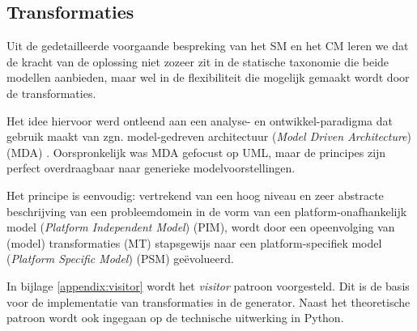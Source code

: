 
\subsection{Transformaties}
\label{subsection:devel-transformations}

Uit de gedetailleerde voorgaande bespreking van het SM en het CM leren we dat
de kracht van de oplossing niet zozeer zit in de statische taxonomie die beide
modellen aanbieden, maar wel in de flexibiliteit die mogelijk gemaakt wordt
door de transformaties.

Het idee hiervoor werd ontleend aan een analyse- en ontwikkel-paradigma dat
gebruik maakt van zgn. model-gedreven architectuur (\emph{Model Driven
Architecture}) (MDA) \citep{soley2000model,kleppe2003mda}. Oorspronkelijk was
MDA gefocust op UML, maar de principes zijn perfect overdraagbaar naar
generieke modelvoorstellingen.

Het principe is eenvoudig: vertrekend van een hoog niveau en zeer abstracte
beschrijving van een probleemdomein in de vorm van een platform-onafhankelijk
model (\emph{Platform Independent Model}) (PIM), wordt door een
opeenvolging van (model) transformaties (MT) stapsgewijs naar een
platform-specifiek model (\emph{Platform Specific Model}) (PSM)
ge\"evolueerd.

In bijlage \ref{appendix:visitor} wordt het \emph{visitor} patroon voorgesteld.
Dit is de basis voor de implementatie van transformaties in de generator. Naast
het theoretische patroon wordt ook ingegaan op de technische uitwerking in
Python.
